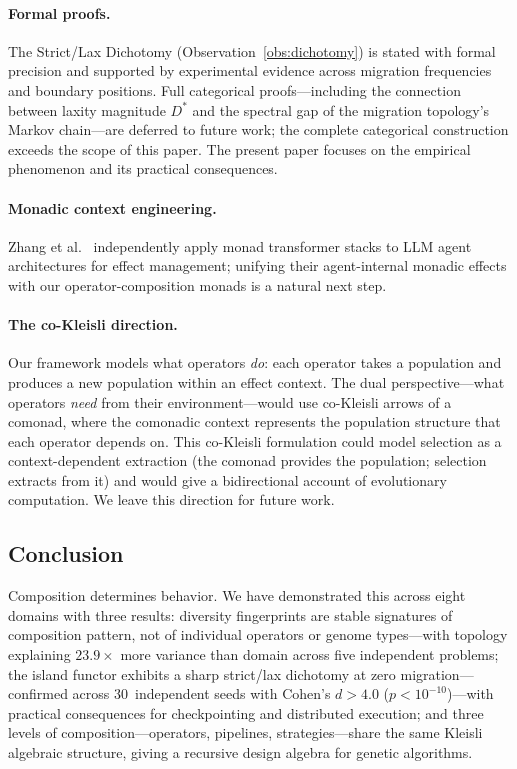 \documentclass[sigconf,anonymous]{acmart}
\begin{document}
\paragraph{Formal proofs.}
The Strict/Lax Dichotomy (Observation~\ref{obs:dichotomy}) is stated with formal precision and supported by experimental evidence across migration frequencies and boundary positions. Full categorical proofs---including the connection between laxity magnitude $D^*$ and the spectral gap of the migration topology's Markov chain---are deferred to future work; the complete categorical construction exceeds the scope of this paper. The present paper focuses on the empirical phenomenon and its practical consequences.

\paragraph{Monadic context engineering.}
Zhang et al.~\cite{zhang2025monadic} independently apply monad transformer stacks to LLM agent architectures for effect management; unifying their agent-internal monadic effects with our operator-composition monads is a natural next step.

\paragraph{The co-Kleisli direction.}
Our framework models what operators \emph{do}: each operator takes a population and produces a new population within an effect context. The dual perspective---what operators \emph{need} from their environment---would use co-Kleisli arrows of a comonad, where the comonadic context represents the population structure that each operator depends on. This co-Kleisli formulation could model selection as a context-dependent extraction (the comonad provides the population; selection extracts from it) and would give a bidirectional account of evolutionary computation. We leave this direction for future work.

\subsection{Conclusion}

Composition determines behavior. We have demonstrated this across eight domains with three results: diversity fingerprints are stable signatures of composition pattern, not of individual operators or genome types---with topology explaining $23.9\times$ more variance than domain across five independent problems; the island functor exhibits a sharp strict/lax dichotomy at zero migration---confirmed across 30~independent seeds with Cohen's $d > 4.0$ ($p < 10^{-10}$)---with practical consequences for checkpointing and distributed execution; and three levels of composition---operators, pipelines, strategies---share the same Kleisli algebraic structure, giving a recursive design algebra for genetic algorithms.
\end{document}
